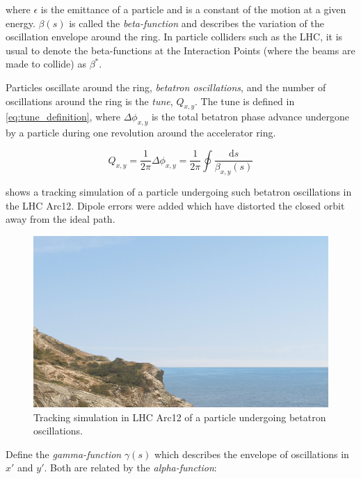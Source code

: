 where $\epsilon$ is the emittance of a particle and is a constant of the motion at a given energy.
$\beta(s)$ is called the \emph{beta-function} and describes the variation of the oscillation envelope around the ring. 
In particle colliders such as the LHC, it is usual to denote the beta-functions at the Interaction Points (where the beams are made to collide) as $\beta^{*}$.
\bigbreak

Particles oscillate around the ring, \emph{betatron oscillations}, and the number of oscillations around the ring is the \emph{tune}, $Q_{x,y}$.
The tune is defined in \cref{eq:tune_definition}, where $\Delta \phi_{x, y}$ is the total betatron phase advance undergone by a particle during one revolution around the accelerator ring.
\bigbreak

\begin{equation}
    Q_{x, y} = \frac{1}{2 \pi} \Delta \phi_{x, y} = \frac{1}{2 \pi} \oint \frac{\mathrm{d}s}{\beta_{x, y}(s)}
    \label{eq:tune_definition}
\end{equation}

 shows a tracking simulation of a particle undergoing such betatron oscillations in the LHC Arc12.
Dipole errors were added which have distorted the closed orbit away from the ideal path.
\bigbreak

\begin{figure}[!htb]
    \begin{center}
    \includegraphics[width = 0.7\linewidth]{Figures/placeholder.png}
    \caption{Tracking simulation in LHC Arc12 of a particle undergoing betatron oscillations.}
    \label{fig:particle_trajectories}
    \end{center}
\end{figure}

Define the \emph{gamma-function} $\gamma(s)$ which describes the envelope of oscillations in $x\prime$ and $y\prime$.
Both are related by the \emph{alpha-function}:
\bigbreak

